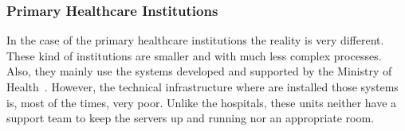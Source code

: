 

\subsubsection{Primary Healthcare Institutions}

In the case of the primary healthcare institutions the reality is very different. These kind of institutions are smaller and with much less complex processes. Also, they mainly use the systems developed and supported by the Ministry of Health~\citep{Saude2010}.
However, the technical infrastructure where are installed those systems is, most of the times, very poor. Unlike the hospitals, these units neither have a support team to keep the servers up and running nor an appropriate room.


%

